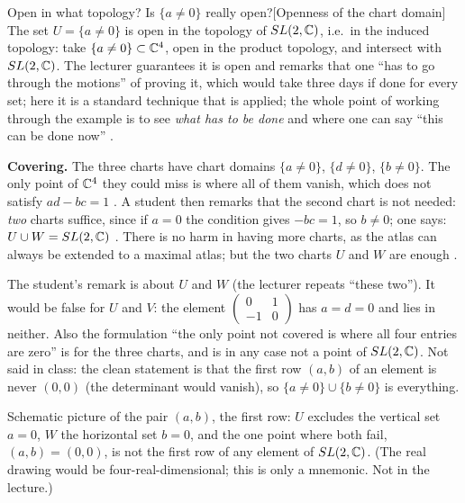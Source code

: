 \begin{paracol}{2}
\begin{answer}{Open in what topology? Is $\{a\neq 0\}$ really open?}[Openness of the chart domain]
The set $U=\{a\ne0\}$ is open in the topology of $SL(2,\C)$, i.e.\ in the induced topology: take $\{a\ne0\}\subset\mathbb{C}^4$, open in the product topology, and intersect with $SL(2,\C)$. The lecturer guarantees it is open and remarks that one ``has to go through the motions'' of proving it, which would take three days if done for every set; here it is a standard technique that is applied; the whole point of working through the example is to see \emph{what has to be done} and where one can say ``this can be done now''    .
\end{answer}
\textbf{Covering.} The three charts have chart domains $\{a\ne0\}$, $\{d\ne0\}$, $\{b\ne0\}$. The only point of $\mathbb{C}^4$ they could miss is where all of them vanish, which does not satisfy $ad-bc=1$    . A student then remarks that the second chart is not needed: \emph{two} charts suffice, since if $a=0$ the condition gives $-bc=1$, so $b\ne0$; one says: $U\cup W=SL(2,\mathbb{C})$  . There is no harm in having more charts, as the atlas can always be extended to a maximal atlas; but the two charts $U$ and $W$ are enough .
\begin{coursenote}
The student's remark is about $U$ and $W$ (the lecturer repeats ``these two''). It would be false for $U$ and $V$: the element $\begin{pmatrix}0&1\\-1&0\end{pmatrix}$ has $a=d=0$ and lies in neither. Also the formulation ``the only point not covered is where all four entries are zero'' is for the three charts, and is in any case not a point of $SL(2,\C)$. Not said in class: the clean statement is that the first row $(a,b)$ of an element is never $(0,0)$ (the determinant would vanish), so $\{a\ne0\}\cup\{b\ne0\}$ is everything. 
\end{coursenote}
\begin{nfigure}
\caption{Schematic picture of the pair $(a,b)$, the first row: $U$ excludes the vertical set $a=0$, $W$ the horizontal set $b=0$, and the one point where both fail, $(a,b)=(0,0)$, is not the first row of any element of $SL(2,\C)$. (The real drawing would be four-real-dimensional; this is only a mnemonic. Not in the lecture.)}
\end{nfigure}


\end{paracol}
